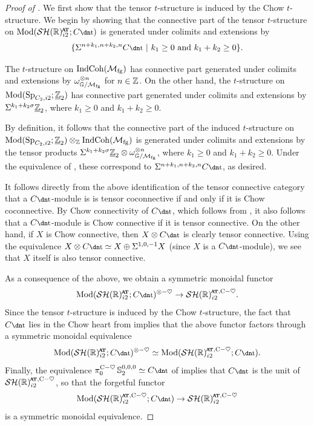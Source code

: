 \begin{proof}[Proof of ]
  We first show that the tensor $t$-structure is induced by the Chow $t$-structure.
  We begin by showing that the connective part of the tensor $t$-structure on $\Mod(\SHRat; C\ta)$ is generated under colimits and extensions by
  \[ \{ \Sigma^{n+k_1, n+k_2,n} C\ta \ \vert \ k_1 \geq 0 \text{ and } k_1 + k_2 \geq 0 \}. \]

  The $t$-structure on $\mathrm{IndCoh}(\mathcal{M}_{\mathrm{fg}})$ has connective part generated under colimits and extensions by $\omega^{\otimes n} _{\mathbb{G}/ \mathcal{M}_{\mathrm{fg}}}$ for $n \in \mathbb{Z}$.
  On the other hand, the $t$-structure on $\mathrm{Mod}(\operatorname{\mathrm{Sp}}_{C_2, i2}; \underline{\mathbb{Z}}_{2})$ has connective part generated under colimits and extensions by $\Sigma^{k_1+ k_2 \sigma} \underline{\mathbb{Z}}_{2}$, where $k_1 \geq 0$ and $k_1 + k_2 \geq 0$.

  By definition, it follows that the connective part of the induced $t$-structure on $\mathrm{Mod}(\operatorname{\mathrm{Sp}}_{C_2, i2}; \underline{\mathbb{Z}}_{2}) \otimes_{\mathbb{Z}} \mathrm{IndCoh}(\mathcal{M}_{\mathrm{fg}})$ is generated under colimits and extensions by the tensor products $\Sigma^{k_1 + k_2 \sigma} \underline{\mathbb{Z}}_{2} \otimes \omega^{\otimes n}_{\mathbb{G} / \mathcal{M}_{\mathrm{fg}}}$, where $k_1 \geq 0$ and $k_1 + k_2 \geq 0$. Under the equivalence of , these correspond to $\Sigma^{n+k_1, n+k_2, n} C\ta$, as desired. 

  It follows directly from the above identification of the tensor connective category that a $C\ta$-module is is tensor coconnective if and only if it is Chow coconnective.
  By Chow connectivity of $C\ta$, which follows from , it also follows that a $C\ta$-module is Chow connective if it is tensor connective.
  On the other hand, if $X$ is Chow connective, then $X \otimes C\ta$ is clearly tensor connective. Using the equivalence $X \otimes C\ta \simeq X \oplus \Sigma^{1,0,-1} X$ (since $X$ is a $C\ta$-module), we see that $X$ itself is also tensor connective.

  As a consequence of the above, we obtain a symmetric monoidal functor
  \[ \Mod(\SHRat; C\ta)^{\th} \to \SHRatch. \]
  Since the tensor $t$-structure is induced by the Chow $t$-structure, the fact that $C\ta$ lies in the Chow heart from  implies that the above functor factors through a symmetric monoidal equivalence
  \[ \Mod(\SHRat; C\ta)^{\th} \simeq \Mod(\SHRatch; C\ta). \]
  Finally, the equivalence $\pi_0 ^{\ch} \Ss_2 ^{0,0,0} \simeq C\ta$ of  implies that $C\ta$ is the unit of $\SHRatch$, so that the forgetful functor
  \[\Mod(\SHRatch; C\ta) \to \SHRatch\]
  is a symmetric monoidal equivalence.
\end{proof}

